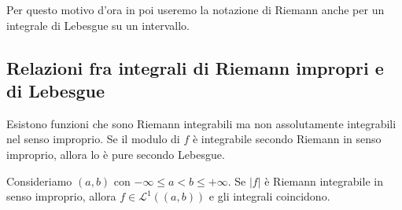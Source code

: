 \documentclass[a4paper]{article}
\begin{document}
\begin{radioactive}
Per questo motivo d'ora in poi useremo la notazione di Riemann
anche per un integrale di Lebesgue su un intervallo.
\end{radioactive}

\subsection{Relazioni fra integrali di Riemann impropri e di Lebesgue}

\begin{radioactive}
Esistono funzioni che sono Riemann integrabili ma non assolutamente integrabili nel senso
improprio.
Se il modulo di \(f\) è integrabile secondo Riemann in senso improprio, allora lo è pure secondo Lebesgue.
\end{radioactive}

\begin{radioactive}
\begin{snippetproposition}{}
    Consideriamo \((a,b)\) con \(-\infty \leq a < b \leq +\infty\).
    Se \(|f|\) è Riemann integrabile in senso improprio, allora
    \(f \in \mathcal L^1((a,b))\) e gli integrali coincidono.
\end{snippetproposition}
\end{radioactive}
\end{document}
